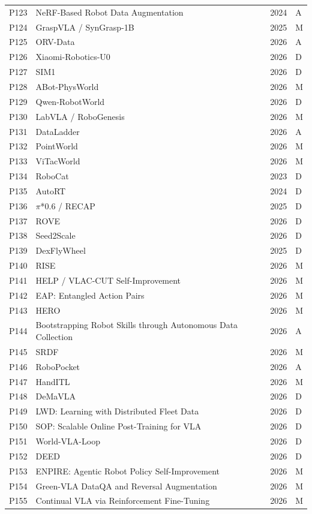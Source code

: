 \begin{longtable}{@{}p{1.3cm}p{11.8cm}p{2.2cm}p{1.2cm}@{}}
P123 & NeRF-Based Robot Data Augmentation & 2024 & A \\
P124 & GraspVLA / SynGrasp-1B & 2025 & M \\
P125 & ORV-Data & 2026 & A \\
P126 & Xiaomi-Robotics-U0 & 2026 & D \\
P127 & SIM1 & 2026 & D \\
P128 & ABot-PhysWorld & 2026 & M \\
P129 & Qwen-RobotWorld & 2026 & D \\
P130 & LabVLA / RoboGenesis & 2026 & M \\
P131 & DataLadder & 2026 & A \\
P132 & PointWorld & 2026 & M \\
P133 & ViTacWorld & 2026 & M \\
P134 & RoboCat & 2023 & D \\
P135 & AutoRT & 2024 & D \\
P136 & $\pi$*0.6 / RECAP & 2025 & D \\
P137 & ROVE & 2026 & D \\
P138 & Seed2Scale & 2026 & D \\
P139 & DexFlyWheel & 2025 & D \\
P140 & RISE & 2026 & M \\
P141 & HELP / VLAC-CUT Self-Improvement & 2026 & M \\
P142 & EAP: Entangled Action Pairs & 2026 & M \\
P143 & HERO & 2026 & M \\
P144 & Bootstrapping Robot Skills through Autonomous Data Collection & 2026 & A \\
P145 & SRDF & 2026 & M \\
P146 & RoboPocket & 2026 & A \\
P147 & HandITL & 2026 & M \\
P148 & DeMaVLA & 2026 & D \\
P149 & LWD: Learning with Distributed Fleet Data & 2026 & D \\
P150 & SOP: Scalable Online Post-Training for VLA & 2026 & D \\
P151 & World-VLA-Loop & 2026 & D \\
P152 & DEED & 2026 & D \\
P153 & ENPIRE: Agentic Robot Policy Self-Improvement & 2026 & M \\
P154 & Green-VLA DataQA and Reversal Augmentation & 2026 & M \\
P155 & Continual VLA via Reinforcement Fine-Tuning & 2026 & M \\

\end{longtable}
